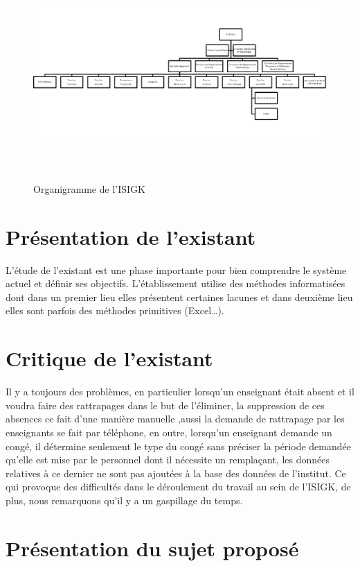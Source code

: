 \documentclass[12 pt]{report}
\begin{document}
\begin{figure}[h]
\includegraphics[height=8cm]{Organigramme.png}
\caption{ Organigramme de l'ISIGK}
\end{figure}
\newpage

\section{Présentation de l’existant }

L’étude de l’existant est une phase importante pour bien comprendre le système actuel et définir ses objectifs. L’établissement utilise des méthodes informatisées dont dans un premier lieu elles présentent certaines lacunes et dans deuxième lieu elles sont parfois des méthodes primitives (Excel…). 
\section{Critique de l’existant }
Il y a toujours des problèmes, en particulier lorsqu’un enseignant était absent et il voudra faire des rattrapages dans le but de l'éliminer, la suppression de ces absences ce fait d’une manière manuelle ,aussi la demande de rattrapage par les enseignants  se fait par téléphone, en outre, lorsqu’un enseignant demande un congé, il détermine seulement le type du congé sans préciser la période demandée qu’elle est mise par le personnel dont il nécessite un remplaçant, les données relatives à ce dernier ne sont pas ajoutées à la base des données de l’institut. 
Ce qui provoque des difficultés dans le déroulement du travail au sein de l’ISIGK, de plus, nous remarquons qu’il y a un gaspillage du temps.    

\section{Présentation du sujet proposé }
\end{document}
